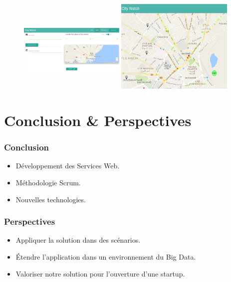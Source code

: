 \documentclass{beamer}
\begin{document}
\begin{frame}
    \begin{center}
    \begin{figure}
        \includegraphics[width=0.45\textwidth,height=4cm]{./figures/sprint2-rapport-screenshot1}
        \includegraphics[width=0.5\textwidth]{./figures/sprint2-dashboard-screenshot2}
    \end{figure}
    \end{center}
\end{frame}

\section{Conclusion \& Perspectives}

\begin{frame}
    \frametitle{Conclusion}
    \begin{itemize}
        \item<1-> Développement des Services Web.
        \item<2-> Méthodologie Scrum.
        \item<3-> Nouvelles technologies.
    \end{itemize}
\end{frame}

\begin{frame}
    \frametitle{Perspectives}
    \begin{itemize}
        \item<1-> Appliquer la solution dans des scénarios.
        \item<2-> Étendre l'application dans un environnement du Big Data.
        \item<3-> Valoriser notre solution pour l'ouverture d'une startup.
    \end{itemize}
\end{frame}
\end{document}
